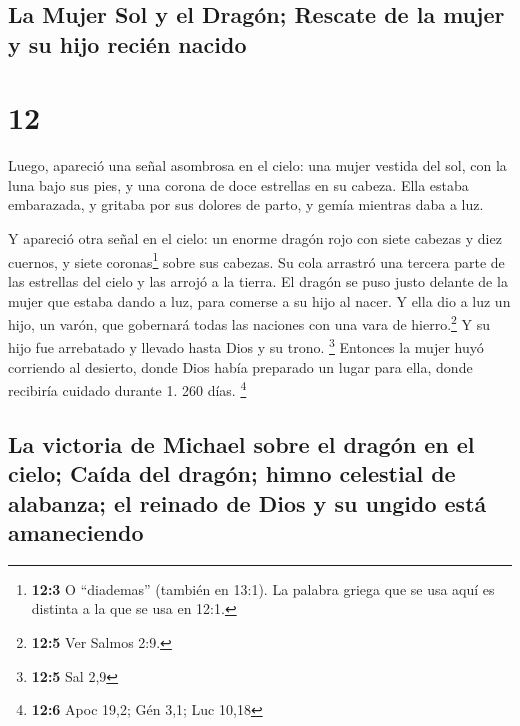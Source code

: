 \hypertarget{la-mujer-sol-y-el-draguxf3n-rescate-de-la-mujer-y-su-hijo-reciuxe9n-nacido}{%
\subsection{La Mujer Sol y el Dragón; Rescate de la mujer y su hijo
recién
nacido}\label{la-mujer-sol-y-el-draguxf3n-rescate-de-la-mujer-y-su-hijo-reciuxe9n-nacido}}

\hypertarget{section-11}{%
\section{12}\label{section-11}}

 Luego, apareció una señal asombrosa en el cielo: una
mujer vestida del sol, con la luna bajo sus pies, y una corona de doce
estrellas en su cabeza.  Ella estaba embarazada, y gritaba
por sus dolores de parto, y gemía mientras daba a luz.

 Y apareció otra señal en el cielo: un enorme dragón rojo
con siete cabezas y diez cuernos, y siete coronas\footnote{\textbf{12:3}
  O ``diademas'' (también en 13:1). La palabra griega que se usa aquí es
  distinta a la que se usa en 12:1.} sobre sus cabezas. 
Su cola arrastró una tercera parte de las estrellas del cielo y las
arrojó a la tierra. El dragón se puso justo delante de la mujer que
estaba dando a luz, para comerse a su hijo al nacer.  Y
ella dio a luz un hijo, un varón, que gobernará todas las naciones con
una vara de hierro.\footnote{\textbf{12:5} Ver Salmos 2:9.} Y su hijo
fue arrebatado y llevado hasta Dios y su trono. \footnote{\textbf{12:5}
  Sal 2,9}  Entonces la mujer huyó corriendo al desierto,
donde Dios había preparado un lugar para ella, donde recibiría cuidado
durante 1. 260 días. \footnote{\textbf{12:6} Apoc 19,2; Gén 3,1; Luc
  10,18}

\hypertarget{la-victoria-de-michael-sobre-el-draguxf3n-en-el-cielo-cauxedda-del-draguxf3n-himno-celestial-de-alabanza-el-reinado-de-dios-y-su-ungido-estuxe1-amaneciendo}{%
\subsection{La victoria de Michael sobre el dragón en el cielo; Caída
del dragón; himno celestial de alabanza; el reinado de Dios y su ungido
está
amaneciendo}\label{la-victoria-de-michael-sobre-el-draguxf3n-en-el-cielo-cauxedda-del-draguxf3n-himno-celestial-de-alabanza-el-reinado-de-dios-y-su-ungido-estuxe1-amaneciendo}}

